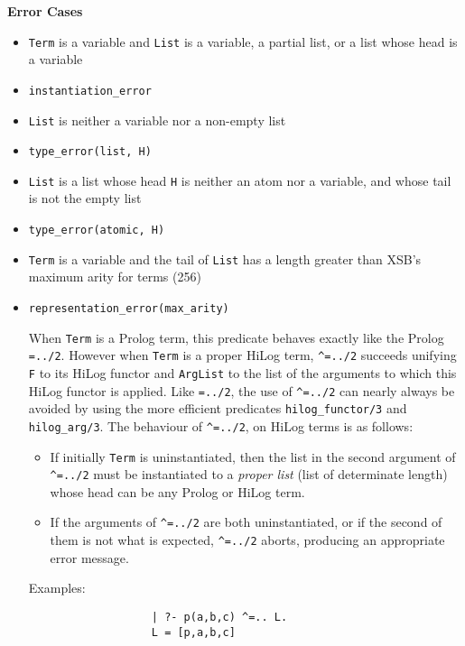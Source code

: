 \begin{description}
{\bf Error Cases}
\begin{itemize}
\item {\tt Term} is a variable and {\tt List} is a variable, a partial list,
  or a list whose head is a variable
\bi
\item {\tt instantiation\_error}
\ei
\item {\tt List} is neither a variable nor a non-empty list
\bi
\item {\tt type\_error(list, H)}
\ei
\item {\tt List} is a list whose head {\tt H} is neither an atom nor a
  variable, and whose tail is not the empty list 
\bi
\item {\tt type\_error(atomic, H)}
\ei
\item {\tt Term} is a variable and the tail of {\tt List} has a length
  greater than XSB's maximum arity for terms (256) 
\bi
\item {\tt representation\_error(max\_arity)}
\ei
\ei


    When {\tt Term} is a Prolog term, this predicate behaves exactly like
    the Prolog {\tt =../2}. However when {\tt Term} is a proper HiLog term, 
    {\tt \verb|^|=../2} 
    succeeds unifying {\tt F} to its HiLog functor and {\tt ArgList} to the 
    list of the arguments to which this HiLog functor is applied. Like 
    {\tt =../2}, the use of {\tt \verb|^|=../2} can nearly always be avoided
    by using the more efficient predicates {\tt hilog\_functor/3} and 
    {\tt hilog\_arg/3}. The behaviour of {\tt \verb|^|=../2}, on HiLog terms 
    is as follows:
    \begin{itemize}
    \item If initially {\tt Term} is uninstantiated, then the list in the 
          second argument of {\tt \verb|^|=../2} must be instantiated to 
          a {\em proper list} (list of determinate length) whose head can 
          be any Prolog or HiLog term.
    \item If the arguments of {\tt \verb|^|=../2} are both uninstantiated, 
          or if the second of them is not what is expected, 
          {\tt \verb|^|=../2} aborts, producing an appropriate error message.
    \end{itemize}
    Examples:
    {\footnotesize
     \begin{verbatim}
                   | ?- p(a,b,c) ^=.. L.
                   L = [p,a,b,c]


\end{verbatim}}
\end{itemize}
\end{description}
